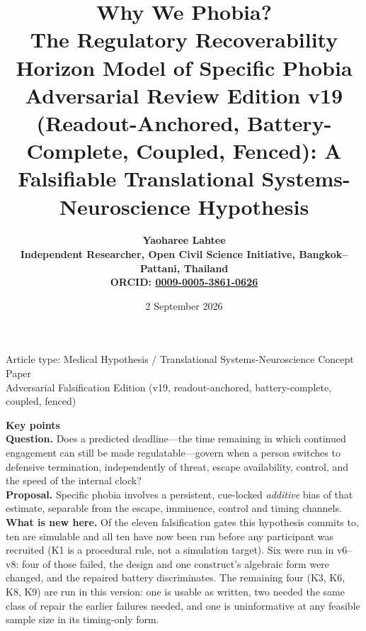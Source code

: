 \documentclass[9pt,twocolumn]{article}
\title{\vspace{-1.1em}
{\sffamily\bfseries\fontsize{19}{21}\selectfont\color{RRHMNavy} Why We Phobia?}\\[0.35em]
{\sffamily\bfseries\fontsize{12.0}{14}\selectfont The Regulatory Recoverability Horizon Model of Specific Phobia}\\[0.18em]
{\sffamily\fontsize{9.2}{11}\selectfont\color{RRHMSlate} Adversarial Review Edition v19 (Readout-Anchored, Battery-Complete, Coupled, Fenced): A Falsifiable Translational Systems-Neuroscience Hypothesis}}
\author{\sffamily\bfseries Yaoharee Lahtee\\[0.2em]
{\sffamily\mdseries\small Independent Researcher, Open Civil Science Initiative, Bangkok--Pattani, Thailand}\\
{\sffamily\mdseries\small ORCID: \href{https://orcid.org/0009-0005-3861-0626}{0009-0005-3861-0626}}}
\date{\sffamily\small 2 September 2026}
\begin{document}
\maketitle
\thispagestyle{fancy}

\begin{center}
\small\sffamily\color{RRHMSlate}
Article type: Medical Hypothesis / Translational Systems-Neuroscience Concept Paper\\
Adversarial Falsification Edition (v19, readout-anchored, battery-complete, coupled, fenced)
\end{center}

\vspace{0.15em}
\begin{center}
\end{center}

\vspace{0.35em}
\begin{center}
\parbox{0.95\columnwidth}{\footnotesize\sffamily\color{RRHMNavy}
\textbf{\color{RRHMSlate}Key points}\\[0.25em]
\textbf{Question.} Does a predicted deadline---the time remaining in which
continued engagement can still be made regulatable---govern when a person
switches to defensive termination, independently of threat, escape
availability, control, and the speed of the internal clock?\\[0.2em]
\textbf{Proposal.} Specific phobia involves a persistent, cue-locked
\emph{additive} bias of that estimate, separable from the escape, imminence,
control and timing channels.\\[0.2em]
\textbf{What is new here.} Of the eleven falsification gates this hypothesis
commits to, ten are simulable and all ten have now been run before any
participant was recruited (K1 is a procedural rule, not a simulation target).
Six were run in v6--v8: four of those failed, the design and one construct's
algebraic form were changed, and the repaired battery discriminates. The
remaining four (K3, K6, K8, K9) are run in this version: one is usable as
written, two needed the same class of repair the earlier failures needed, and
one is uninformative at any feasible sample size in its timing-only form.}
\end{center}
\end{document}
